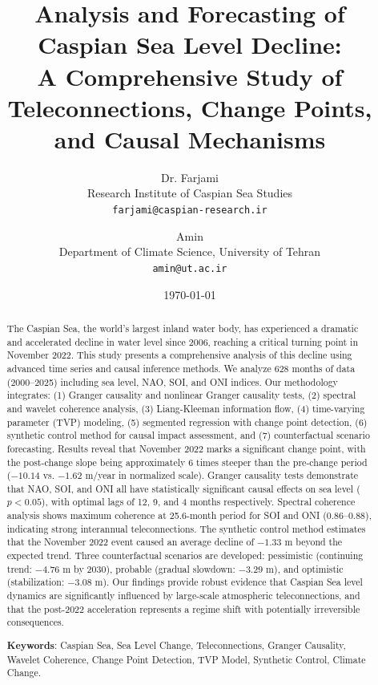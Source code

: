 \documentclass[12pt,a4paper,twocolumn]{article}
\title{\textbf{Analysis and Forecasting of Caspian Sea Level Decline: \\ A Comprehensive Study of Teleconnections, Change Points, and Causal Mechanisms}}
\author{
    \large{Dr. Farjami} \\
    \small{Research Institute of Caspian Sea Studies} \\
    \small{\texttt{farjami@caspian-research.ir}}
    \and
    \large{Amin} \\
    \small{Department of Climate Science, University of Tehran} \\
    \small{\texttt{amin@ut.ac.ir}}
}
\date{\today}
\begin{document}
\maketitle

\begin{abstract}
\noindent The Caspian Sea, the world's largest inland water body, has experienced a dramatic and accelerated decline in water level since 2006, reaching a critical turning point in November 2022. This study presents a comprehensive analysis of this decline using advanced time series and causal inference methods. We analyze 628 months of data (2000--2025) including sea level, NAO, SOI, and ONI indices. Our methodology integrates: (1) Granger causality and nonlinear Granger causality tests, (2) spectral and wavelet coherence analysis, (3) Liang-Kleeman information flow, (4) time-varying parameter (TVP) modeling, (5) segmented regression with change point detection, (6) synthetic control method for causal impact assessment, and (7) counterfactual scenario forecasting. Results reveal that November 2022 marks a significant change point, with the post-change slope being approximately 6 times steeper than the pre-change period ($-10.14$ vs. $-1.62$ m/year in normalized scale). Granger causality tests demonstrate that NAO, SOI, and ONI all have statistically significant causal effects on sea level ($p < 0.05$), with optimal lags of 12, 9, and 4 months respectively. Spectral coherence analysis shows maximum coherence at 25.6-month period for SOI and ONI (0.86--0.88), indicating strong interannual teleconnections. The synthetic control method estimates that the November 2022 event caused an average decline of $-1.33$ m beyond the expected trend. Three counterfactual scenarios are developed: pessimistic (continuing trend: $-4.76$ m by 2030), probable (gradual slowdown: $-3.29$ m), and optimistic (stabilization: $-3.08$ m). Our findings provide robust evidence that Caspian Sea level dynamics are significantly influenced by large-scale atmospheric teleconnections, and that the post-2022 acceleration represents a regime shift with potentially irreversible consequences.

\vspace{0.3cm}
\noindent \textbf{Keywords}: Caspian Sea, Sea Level Change, Teleconnections, Granger Causality, Wavelet Coherence, Change Point Detection, TVP Model, Synthetic Control, Climate Change.
\end{abstract}
\end{document}
